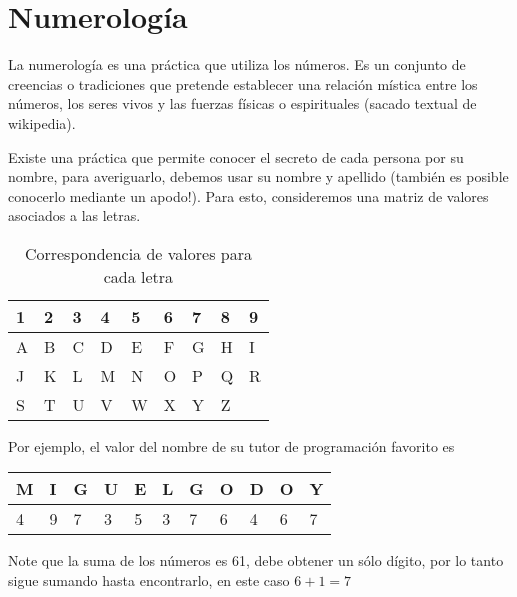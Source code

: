 \section{Numerología}

La numerología es una práctica que utiliza los números. Es un conjunto de creencias o tradiciones que pretende establecer una relación mística entre los números, los seres vivos y las fuerzas físicas o espirituales (sacado textual de wikipedia).

Existe una práctica que permite conocer el secreto de cada persona por su nombre, para averiguarlo, debemos usar su nombre y apellido (también es posible conocerlo mediante un apodo!). Para esto, consideremos una matriz de valores asociados a las letras.

\begin{table}[h]
\centering
\caption{Correspondencia de valores para cada letra}
\begin{tabular}{|l|l|l|l|l|l|l|l|l|}
\hline
\textbf{1} & \textbf{2} & \textbf{3} & \textbf{4} & \textbf{5} & \textbf{6} & \textbf{7} & \textbf{8} & \textbf{9} \\ \hline
A          & B          & C          & D          & E          & F          & G          & H          & I          \\ \hline
J          & K          & L          & M          & N          & O          & P          & Q          & R          \\ \hline
S          & T          & U          & V          & W          & X          & Y          & Z          &            \\ \hline
\end{tabular}
\end{table}

Por ejemplo, el valor del nombre de su tutor de programación favorito es

\begin{table}[H]
\centering
\begin{tabular}{|l|l|l|l|l|l|l|l|l|l|l|}
\hline
\textbf{M} & \textbf{I} & \textbf{G} & \textbf{U} & \textbf{E} & \textbf{L} & \textbf{G} & \textbf{O} & \textbf{D} & \textbf{O} & \textbf{Y} \\ \hline
4          & 9          & 7          & 3          & 5          & 3          & 7          & 6          & 4          & 6          & 7          \\ \hline
\end{tabular}
\end{table}
Note que la suma de los números es 61, debe obtener un sólo dígito, por lo tanto sigue sumando hasta encontrarlo, en este caso $6+1=7$

